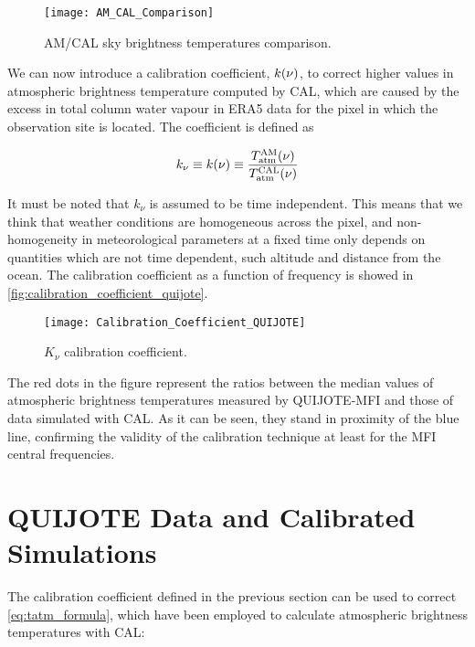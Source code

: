 \begin{figure}
        \centering
        \texttt{[image: AM\_CAL\_Comparison]}
        \caption{AM/CAL sky brightness temperatures comparison.}
        \label{fig:am_cal_comparison}
\end{figure}

We can now introduce a calibration coefficient, $k\qty(\nu)$, to correct
higher values in atmospheric brightness temperature computed by CAL, which
are caused by the excess in total column water vapour in ERA5 data for
the pixel in which the observation site is located. The coefficient is defined as

\begin{equation}
        k_\nu \equiv  k\qty(\nu) \equiv
        \frac{T^\text{AM}_\text{atm}\qty(\nu)}{
        T^\text{CAL}_\text{atm}\qty(\nu)}
\end{equation}

It must be noted that $k_\nu$ is assumed to be time independent. This means
that we think that weather conditions are homogeneous across the pixel, and
non-homogeneity in meteorological parameters at a fixed time only depends
on quantities which are not time dependent, such altitude and distance from
the ocean. The calibration coefficient as a function of frequency is showed
in \autoref{fig:calibration_coefficient_quijote}.

\begin{figure}
        \centering
        \texttt{[image: Calibration\_Coefficient\_QUIJOTE]}
        \caption{$K_\nu$ calibration coefficient.}
        \label{fig:calibration_coefficient_quijote}
\end{figure}

The red dots in the figure represent the ratios between the median values of
atmospheric brightness temperatures measured by QUIJOTE-MFI and those of data
simulated with CAL. As it can be seen, they stand in proximity of the
blue line, confirming the validity of the calibration technique at least
for the MFI central frequencies.

\section{QUIJOTE Data and Calibrated Simulations}

The calibration coefficient defined in the previous section can be used to
correct \autoref{eq:tatm_formula}, which have been employed to calculate
atmospheric brightness temperatures with CAL:

